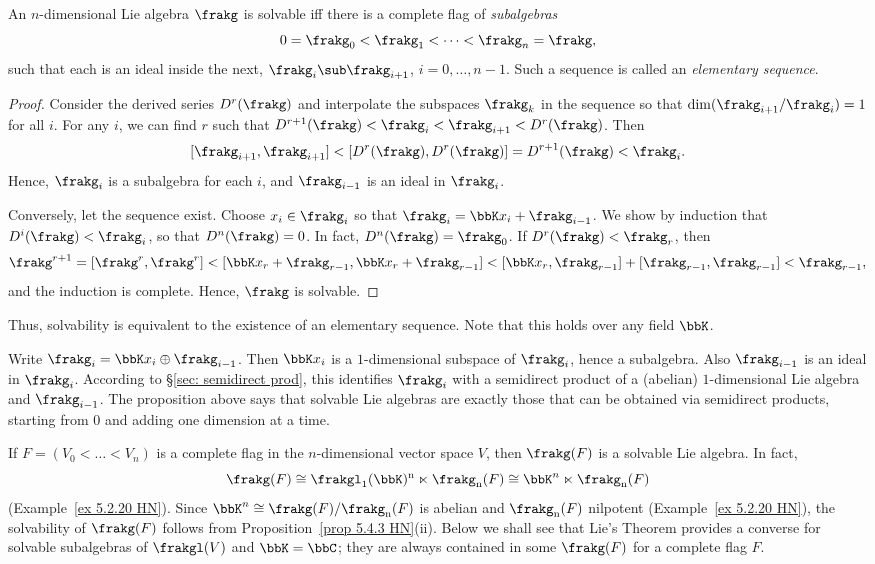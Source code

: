 \begin{prop}\label{prop 1.23 Knapp}
    An $n$-dimensional Lie algebra $
    \frakg$ is solvable iff there is a complete flag of \emph{subalgebras} 
    \[0=\frakg_0<\frakg_1<\cdots <\frakg_n=\frakg,\]
    such that each is an ideal inside the next, $\frakg_i\sub\frakg_{i+1}$, $i=0,\ldots,n-1$. Such a sequence is called an \emph{elementary sequence}.
\end{prop}
\begin{proof}
    Consider the derived series $D^r(\frakg)$ and interpolate the subspaces $\frakg_k$ in the sequence so that $\dim(\frakg_{i+1}/\frakg_{i})=1$ for all $i$. For any $i$, we can find $r$ such that $D^{r+1}(\frakg)<\frakg_i<\frakg_{i+1}<D^r(\frakg)$. Then 
    \[[\frakg_{i+1},\frakg_{i+1}]<[D^r(\frakg),D^r(\frakg)]=D^{r+1}(\frakg)<\frakg_i.\]
    Hence, $\frakg_i$ is a subalgebra for each $i$, and $\frakg_{i-1}$ is an ideal in $\frakg_i$.

    Conversely, let the sequence exist. Choose $x_i\in\frakg_i$ so that $\frakg_i=\bbK x_i+\frakg_{i-1}$. We show by induction that $D^i(\frakg)<\frakg_i$, so that $D^n(\frakg)=0$. In fact, $D^n(\frakg)=\frakg_0$. If $D^r(\frakg)<\frakg_r$, then 
    \[\frakg^{r+1}=[\frakg^r,\frakg^r]<[\bbK x_r+\frakg_{r-1},\bbK x_r+\frakg_{r-1}]<[\bbK x_r,\frakg_{r-1}]+[\frakg_{r-1},\frakg_{r-1}]<\frakg_{r-1},\]
    and the induction is complete. Hence, $\frakg$ is solvable.
\end{proof}

Thus, solvability is equivalent to the existence of an elementary sequence. Note that this holds over any field $\bbK$.

\begin{rem}
    Write $\frakg_i=\bbK x_i\oplus\frakg_{i-1}$. Then $\bbK x_i$ is a $1$-dimensional subspace of $\frakg_i$, hence a subalgebra. Also $\frakg_{i-1}$ is an ideal in $\frakg_{i}$. According to \S\ref{sec: semidirect prod}, this identifies $\frakg_i$ with a semidirect product of a (abelian) $1$-dimensional Lie algebra and $\frakg_{i-1}$. The proposition above says that solvable Lie algebras are exactly those that can be obtained via semidirect products, starting from $0$ and adding one dimension at a time.
\end{rem}

\begin{example}\label{ex 5.4.4 HN}
    If $F=(V_0<\ldots <V_n)$ is a complete flag in the $n$-dimensional vector space $V$, then $\frakg(F)$ is a solvable Lie algebra. In fact, 
    \[\frakg(F)\cong \frakgl_1(\bbK)^{\mathrm{n}}\ltimes\frakg_{\mathrm{n}}(F)\cong \bbK^n\ltimes \frakg_{\mathrm{n}}(F)\]
    (Example~\ref{ex 5.2.20 HN}). Since $\bbK^n\cong \frakg(F)\slash\frakg_{\mathrm{n}}(F)$ is abelian and $\frakg_{\mathrm{n}}(F)$ nilpotent (Example~\ref{ex 5.2.20 HN}), the solvability of $\frakg(F)$ follows from Proposition~\ref{prop 5.4.3 HN}(ii). Below we shall see that Lie's Theorem provides a converse for solvable subalgebras of $\frakgl(V)$ and $\bbK=\bbC$; they are always contained in some $\frakg(F)$ for a complete flag $F$.
\end{example}

